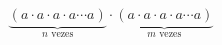 \documentclass[preview]{standalone}
\begin{document}
\begin{align*}
\underbrace{(a \cdot a \cdot a \cdot a \cdots a)}_{n \text{ vezes}} \cdot \underbrace{(a \cdot a \cdot a \cdot a \cdots a)}_{m \text{ vezes}}
\end{align*}
\end{document}
